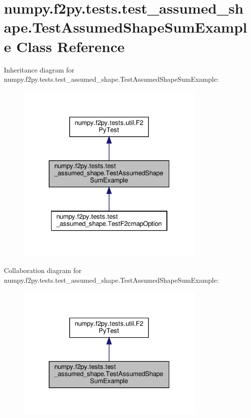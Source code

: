 \hypertarget{classnumpy_1_1f2py_1_1tests_1_1test__assumed__shape_1_1TestAssumedShapeSumExample}{}\section{numpy.\+f2py.\+tests.\+test\+\_\+assumed\+\_\+shape.\+Test\+Assumed\+Shape\+Sum\+Example Class Reference}
\label{classnumpy_1_1f2py_1_1tests_1_1test__assumed__shape_1_1TestAssumedShapeSumExample}


Inheritance diagram for numpy.\+f2py.\+tests.\+test\+\_\+assumed\+\_\+shape.\+Test\+Assumed\+Shape\+Sum\+Example\+:
\nopagebreak
\begin{figure}[H]
\begin{center}
\leavevmode
\includegraphics[width=265pt]{classnumpy_1_1f2py_1_1tests_1_1test__assumed__shape_1_1TestAssumedShapeSumExample__inherit__graph}
\end{center}
\end{figure}


Collaboration diagram for numpy.\+f2py.\+tests.\+test\+\_\+assumed\+\_\+shape.\+Test\+Assumed\+Shape\+Sum\+Example\+:
\nopagebreak
\begin{figure}[H]
\begin{center}
\leavevmode
\includegraphics[width=265pt]{classnumpy_1_1f2py_1_1tests_1_1test__assumed__shape_1_1TestAssumedShapeSumExample__coll__graph}
\end{center}
\end{figure}
